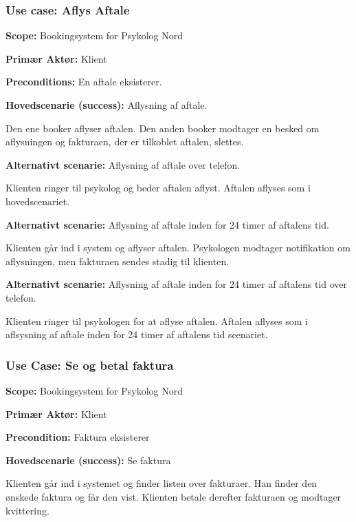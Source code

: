 \subsubsection{Use case: Aflys Aftale}
{\setlength{\parindent}{0cm}
\textbf{Scope:} Bookingsystem for Psykolog Nord

\textbf{Primær Aktør:} Klient

\textbf{Preconditions:} En aftale eksisterer.

\textbf{Hovedscenarie (success):} Aflysning af aftale.

Den ene booker aflyser aftalen.
Den anden booker modtager en besked om aflysningen og fakturaen, der er tilkoblet aftalen, slettes.

\textbf{Alternativt scenarie:} Aflysning af aftale over telefon.

Klienten ringer til psykolog og beder aftalen aflyst.
Aftalen aflyses som i hovedscenariet.

\textbf{Alternativt scenarie:} Aflysning af aftale inden for 24 timer af aftalens tid.

Klienten går ind i system og aflyser aftalen.
Psykologen modtager notifikation om aflysningen, men fakturaen sendes stadig til klienten.

\textbf{Alternativt scenarie:} Aflysning af aftale inden for 24 timer af aftalens tid over telefon.

Klienten ringer til psykologen for at aflyse aftalen. Aftalen aflyses som i aflsysning af aftale inden for 24 timer af aftalens tid scenariet.
}

\subsubsection{Use Case: Se og betal faktura}
{\setlength{\parindent}{0cm}
\textbf{Scope:} Bookingsystem for Psykolog Nord

\textbf{Primær Aktør:} Klient

\textbf{Precondition:} Faktura eksisterer

\textbf{Hovedscenarie (success):} Se faktura

Klienten går ind i systemet og finder listen over fakturaer. 
Han finder den ønskede faktura og får den vist. Klienten betale derefter fakturaen og modtager kvittering.
}
